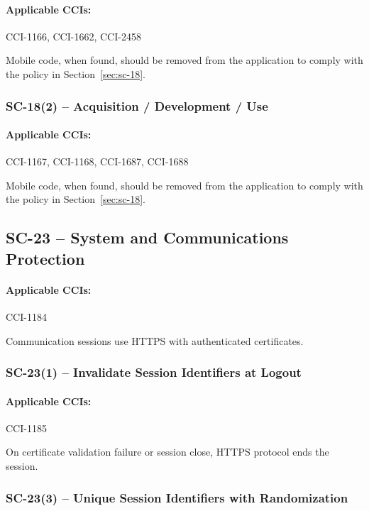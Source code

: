 \documentclass[letterpaper, 10pt, twoside]{article}
\begin{document}
\paragraph{Applicable CCIs:} CCI-1166, CCI-1662, CCI-2458

Mobile code, when found, should be removed from the application to comply with the policy in Section~\ref{sec:sc-18}.

\subsubsection{SC-18(2) -- Acquisition / Development / Use}

\paragraph{Applicable CCIs:} CCI-1167, CCI-1168, CCI-1687, CCI-1688

Mobile code, when found, should be removed from the application to comply with the policy in Section~\ref{sec:sc-18}.

\subsection{SC-23 -- System and Communications Protection}

\paragraph{Applicable CCIs:} CCI-1184

Communication sessions use HTTPS with authenticated certificates.

\subsubsection{SC-23(1) -- Invalidate Session Identifiers at Logout}

\paragraph{Applicable CCIs:} CCI-1185

On certificate validation failure or session close, HTTPS protocol ends the session.

\subsubsection{SC-23(3) -- Unique Session Identifiers with Randomization}
\end{document}
